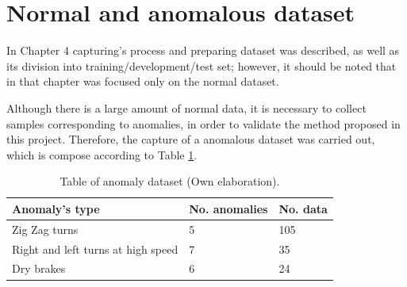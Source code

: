 \section{Normal and anomalous dataset}

In Chapter 4 capturing's process and preparing dataset was described, as well as its division into training/development/test set; however, it should be noted that in that chapter was focused only on the normal dataset.

\vspace{5mm} %

Although there is a large amount of normal data, it is necessary to collect samples corresponding to anomalies, in order to validate the method proposed in this project. Therefore, the capture of a anomalous dataset was carried out, which is compose according to Table \ref{table:conjunto_anomalias}.

\begin{table}[H]
\centering
\begin{tabular}{|l|l|l|}
\hline
\textbf{Anomaly's type} & \textbf{No. anomalies} & \textbf{No. data} \\ \hline
Zig Zag turns & 5 & 105  \\ \hline
Right and left turns at high speed & 7 & 35  \\ \hline
Dry brakes & 6 & 24 \\ \hline
\end{tabular}
\caption{Table of anomaly dataset (Own elaboration).}
\label{table:conjunto_anomalias}
\end{table}

\vspace{5mm} %

